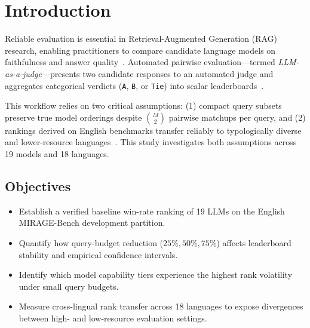 \documentclass[sigconf]{acmart}
\begin{document}

\maketitle

\section{Introduction}
Reliable evaluation is essential in Retrieval-Augmented Generation (RAG) research, enabling practitioners to compare candidate language models on faithfulness and answer quality~\cite{lewis2020rag,gao2023rag}. Automated pairwise evaluation---termed \textit{LLM-as-a-judge}---presents two candidate responses to an automated judge and aggregates categorical verdicts (\texttt{A}, \texttt{B}, or \texttt{Tie}) into scalar leaderboards~\cite{zheng2023judging,chiang2024chatbot}.

This workflow relies on two critical assumptions: (1) compact query subsets preserve true model orderings despite $\binom{M}{2}$ pairwise matchups per query, and (2) rankings derived on English benchmarks transfer reliably to typologically diverse and lower-resource languages~\cite{thakur2024mirage}. This study investigates both assumptions across 19 models and 18 languages.

\subsection{Objectives}
\begin{itemize}
    \item Establish a verified baseline win-rate ranking of 19 LLMs on the English MIRAGE-Bench development partition.
    \item Quantify how query-budget reduction ($25\%, 50\%, 75\%$) affects leaderboard stability and empirical confidence intervals.
    \item Identify which model capability tiers experience the highest rank volatility under small query budgets.
    \item Measure cross-lingual rank transfer across 18 languages to expose divergences between high- and low-resource evaluation settings.
\end{itemize}
\end{document}
